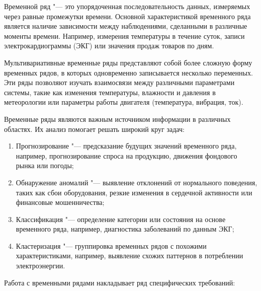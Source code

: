 \documentclass[spec, och, diploma]{SCWorks}
\begin{document}
            Временной ряд "--- это упорядоченная последовательность данных,
            измеряемых через равные промежутки времени. Основной характеристикой
            временного ряда является наличие зависимости между наблюдениями,
            сделанными в различные моменты времени. Например, измерения температуры
            в течение суток, записи электрокардиограммы (ЭКГ) или значения продаж
            товаров по дням.

            Мультивариативные временные ряды представляют собой более сложную форму
            временных рядов, в которых одновременно записывается несколько
            переменных. Эти ряды позволяют изучать взаимосвязи между различными
            параметрами системы, такие как изменения температуры, влажности и
            давления в метеорологии или параметры работы двигателя (температура,
            вибрация, ток).

            Временные ряды являются важным источником информации в различных
            областях. \cite{tsnml} Их анализ помогает решать широкий круг задач:

            \begin{enumerate}
                \item Прогнозирование "--- предсказание будущих значений временного
                ряда, например, прогнозирование спроса на продукцию, движения
                фондового рынка или погоды;
                \item Обнаружение аномалий "--- выявление отклонений от нормального
                поведения, таких как сбои оборудования, резкие изменения в сердечной
                активности или финансовые мошенничества;
                \item Классификация "--- определение категории или состояния на
                основе временного ряда, например, диагностика заболеваний по данным
                ЭКГ;
                \item Кластеризация "--- группировка временных рядов с похожими
                характеристиками, например, выявление схожих паттернов в потреблении
                электроэнергии.
            \end{enumerate}

            Работа с временными рядами накладывает ряд специфических требований:
\end{document}
